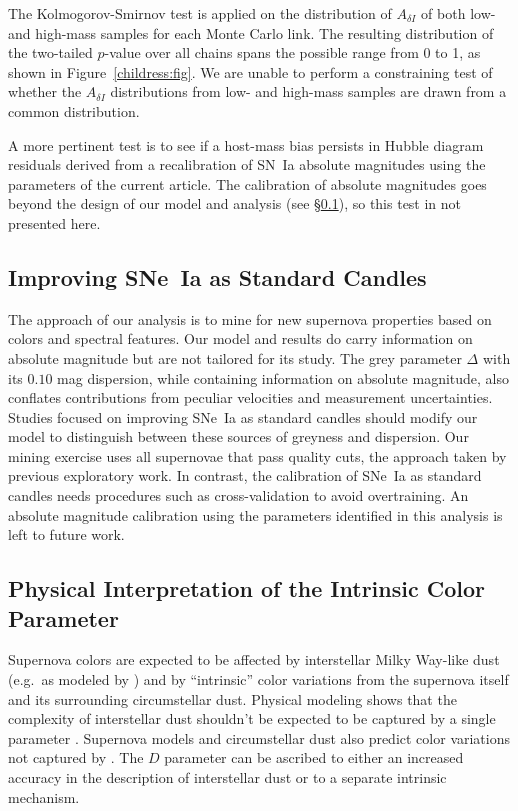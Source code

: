 \documentclass{aastex61}   	%
\begin{document}
The Kolmogorov-Smirnov test is applied on the distribution of $A_{\delta I}$ of both low- and high-mass samples for
each Monte Carlo link.  The resulting distribution of the two-tailed $p$-value  over all chains spans the possible range from 0 to 1, as shown in Figure~\ref{childress:fig}.  We are unable to perform a constraining test of whether the $A_{\delta I}$ distributions from low- and high-mass samples
are drawn from a common distribution.

A more pertinent test is to see if a host-mass bias persists in Hubble diagram residuals
derived from a recalibration of SN~Ia absolute magnitudes using the parameters of the current article.
The calibration of absolute magnitudes goes beyond the design of our model and analysis (see \S\ref{standard:sec}), so this test
in not presented here.

\subsection{Improving SNe~Ia as Standard Candles}
\label{standard:sec}
The approach of our analysis is to mine for new supernova properties based on colors and spectral features.
Our model and results do carry information on absolute magnitude but are not tailored for its study.
The grey parameter $\Delta$ with its $0.10$ mag dispersion, while containing information on absolute magnitude, 
also conflates
contributions from peculiar velocities and measurement uncertainties.  Studies
focused on improving SNe~Ia as standard candles should modify  our model to
distinguish between these sources of greyness and dispersion.
Our
mining exercise uses all supernovae that pass quality cuts, the approach taken by previous
exploratory work.  In contrast, the calibration of SNe~Ia as standard candles needs procedures such
as cross-validation to avoid overtraining.
An absolute magnitude calibration using the parameters identified in this analysis is left to future work.


\subsection{Physical Interpretation of the Intrinsic Color Parameter}
\color{red}
Supernova colors are expected to be affected by interstellar Milky Way-like dust (e.g.\ as modeled by  )
and by ``intrinsic'' color variations from the supernova itself and its surrounding circumstellar dust. Physical modeling
shows that the complexity of interstellar dust shouldn't be expected to be captured by a single parameter \citep{2015ApJ...807L..26G,
2017ApJ...836...13H}. Supernova models \citep[e.g.][]{2007ApJ...662..487W,2013MNRAS.436..333S,2014MNRAS.441..532D,2015MNRAS.454.2549B,
2017ApJ...846...58H} and circumstellar dust \citep{2008ApJ...686L.103G} also predict color variations not  captured
by  .
The $D$ parameter
can be ascribed to either an increased accuracy in the description of interstellar dust or to a separate intrinsic mechanism.  
\end{document}
